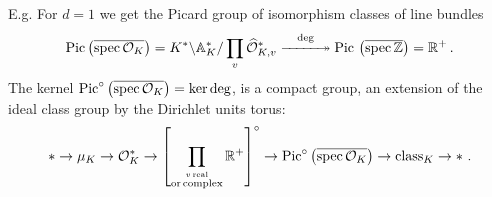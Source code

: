 \documentclass[leqno]{article}
\numberwithin{equation}{section}
\begin{document}
E.g. For $d=1$ we get the Picard group of isomorphism classes of line bundles
\begin{equation}
\label{eq1119}
{\rm Pic} \left( \overline{{\rm spec} \, {\mathcal O}_K} \right) = K^* \backslash {\mathbb A}_K^* / \prod_v \widehat{\mathcal O}_{K,v}^* \overset{\rm deg}{-\!\!\!-\!\!\!-\!\!\!-\!\!\!-\!\!\!\twoheadrightarrow} {\rm Pic} \, \left(\overline{{\rm spec} \, {\mathbb Z}}\right) = {\mathbb R}^+ \, .
\end{equation}
The kernel ${\rm Pic}^{\circ} \left( \overline{{\rm spec} \, {\mathcal O}_K} \right) = \ker \deg$, is a compact group, an extension of the ideal class group by the Dirichlet units torus:
\begin{equation}
\label{eq1120}
* \to \mu_K \to {\mathcal O}_K^* \to \left[ \prod_{ {\overset{v \, {\rm real}}{{\rm or \,
complex}}} } {\mathbb R}^+ \right]^{\circ} \to {\rm Pic}^{\circ} \left( \overline{{\rm spec} \, {\mathcal O}_K} \right) \to {\rm class}_K \to * \ .
\end{equation}


\newpage
\end{document}

